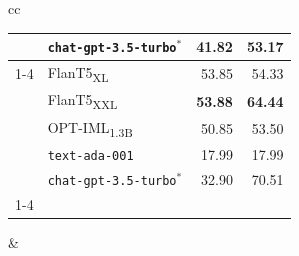 \begin{table}[t]
\begin{tabular}{cc}
\begin{minipage}{.5\linewidth}
{\begin{tabular}{llrr}
             & \texttt{chat-gpt-3.5-turbo$^*$} & 41.82 & 53.17 \\
            \cmidrule{1-4}
            \multirow[c]{5}{*}{\rotatebox{90}{\TweetQA}} & FlanT5\textsubscript{XL} & 53.85 & 54.33 \\
             & FlanT5\textsubscript{XXL} & \textbf{53.88} & \textbf{64.44} \\
             & OPT-IML\textsubscript{1.3B} & 50.85 & 53.50 \\
             & \texttt{text-ada-001} & 17.99 & 17.99 \\
             & \texttt{chat-gpt-3.5-turbo$^*$} & 32.90 & 70.51 \\
            \cmidrule{1-4}
            \end{tabular}}
    \end{minipage} &


\end{tabular}
\end{table}
